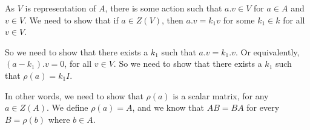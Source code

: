 
As $V$ is representation of $A$, there is some action such that $a.v\in V$ for $a \in A$ and $v\in V$. We need to show that if $a \in Z(V)$, then $a.v = k_1 v$ for some $k_1 \in k$ for all $v\in V$. 

So we need to show that there exists a $k_1$ such that $a.v=k_1.v$. 
Or equivalently, $(a-k_1).v=0$, for all $v \in V$. 
So we need to show that there exists  a $k_1$ such that $\rho(a)=k_1I$.

In other words, we need to show that $\rho(a)$ is a scalar matrix, for any $a \in Z(A)$. 
We define $\rho(a)=A$, and we know that $AB=BA$ for every $B=\rho(b)$ where $b\in A$. 